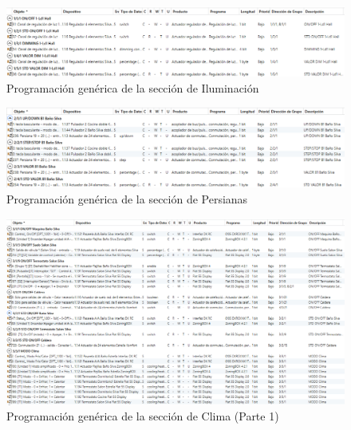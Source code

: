 \begin{landscape}

\begin{figure}[H]
\includegraphics[width=1.55\textwidth]{figures/prog_dim.png}   
\caption{Programación genérica de la sección de Iluminación}
\label{fig:prog_dim}
\end{figure}

\begin{figure}[H]
\includegraphics[width=1.55\textwidth]{figures/prog_pers.png}   
\caption{Programación genérica de la sección de Persianas}
\label{fig:prog_pers}
\end{figure}

\begin{figure}[H]
\includegraphics[width=1.65\textwidth]{figures/prog_clima1.png}   
\caption{Programación genérica de la sección de Clima (Parte 1)}
\label{fig:prog_clima1}
\end{figure}


\end{landscape}
